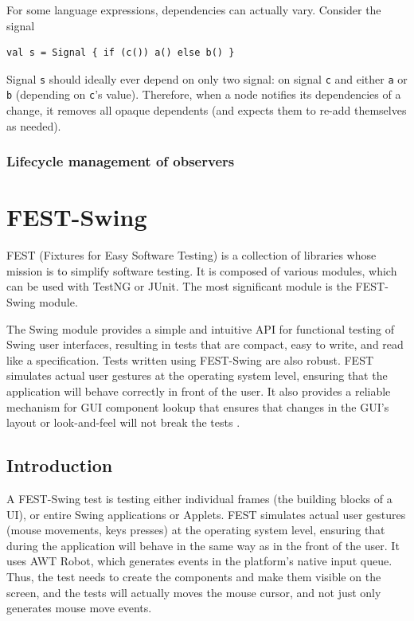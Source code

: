 For some language expressions, dependencies can actually vary. Consider the signal
\begin{lstlisting}
val s = Signal { if (c()) a() else b() }
\end{lstlisting}
Signal \texttt{s} should ideally ever depend on only two signal: on signal \texttt{c} and either \texttt{a} or \texttt{b} (depending on \texttt{c}'s value). Therefore, when a node notifies its dependencies of a change, it removes all opaque dependents (and expects them to re-add themselves as needed).


\subsubsection{Lifecycle management of observers}






\section{FEST-Swing}\label{sec:fest-swing}

FEST (Fixtures for Easy Software Testing) is a collection of libraries whose mission is to simplify software testing. It is composed of various modules, which can be used with TestNG or JUnit. The most significant module is the FEST-Swing module.

The Swing module provides a simple and intuitive API for functional testing of Swing user interfaces, resulting in tests that are compact, easy to write, and read like a specification. Tests written using FEST-Swing are also robust. FEST simulates actual user gestures at the operating system level, ensuring that the application will behave correctly in front of the user. It also provides a reliable mechanism for GUI component lookup that ensures that changes in the GUI's layout or look-and-feel will not break the tests \cite{FESTMain}.

\subsection{Introduction}

A FEST-Swing test is testing either individual frames (the building blocks of a UI), or entire Swing applications or Applets. FEST simulates actual user gestures (mouse movements, keys presses) at the operating system level, ensuring that during the application will behave in the same way as in the front of the user. It uses AWT Robot, which generates events in the platform's native input queue. Thus, the test needs to create the components and make them visible on the screen, and the tests will actually moves the mouse cursor, and not just only generates mouse move events.

